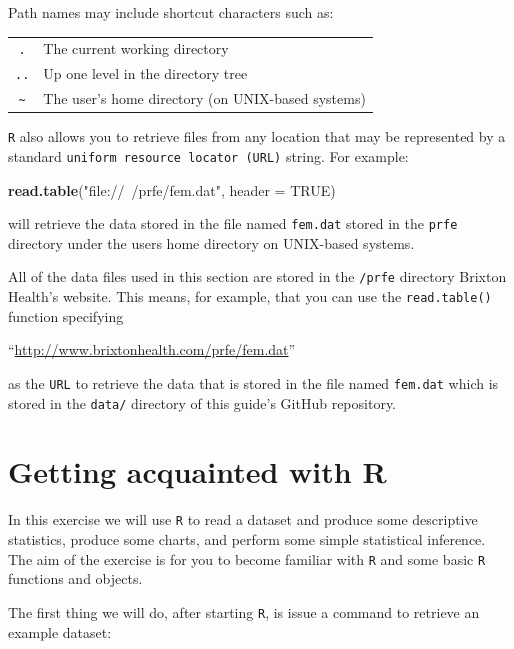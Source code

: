 \documentclass[12pt,a4paper]{book}
\newenvironment{Shaded}{\begin{snugshade}}{\end{snugshade}}
\newcommand{\KeywordTok}[1]{\textcolor[rgb]{0.13,0.29,0.53}{\textbf{#1}}}
\newcommand{\DataTypeTok}[1]{\textcolor[rgb]{0.13,0.29,0.53}{#1}}
\newcommand{\StringTok}[1]{\textcolor[rgb]{0.31,0.60,0.02}{#1}}
\newcommand{\OtherTok}[1]{\textcolor[rgb]{0.56,0.35,0.01}{#1}}
\newcommand{\NormalTok}[1]{#1}
\theoremstyle{definition}
\theoremstyle{definition}
\theoremstyle{definition}
\theoremstyle{remark}
\begin{document}
Path names may include shortcut characters such as:

\begin{longtable}[]{@{}cl@{}}
\toprule
\texttt{.} & The current working directory\tabularnewline
\texttt{..} & Up one level in the directory tree\tabularnewline
\texttt{\textasciitilde{}} & The user's home directory (on UNIX-based
systems)\tabularnewline
\bottomrule
\end{longtable}

\texttt{R} also allows you to retrieve files from any location that may
be represented by a standard \texttt{uniform\ resource\ locator\ (URL)}
string. For example:

\begin{Shaded}
\begin{Highlighting}[]
\KeywordTok{read.table}\NormalTok{(}\StringTok{"file://~/prfe/fem.dat"}\NormalTok{, }\DataTypeTok{header =} \OtherTok{TRUE}\NormalTok{)}
\end{Highlighting}
\end{Shaded}

will retrieve the data stored in the file named \texttt{fem.dat} stored
in the \texttt{prfe} directory under the users home directory on
UNIX-based systems.

All of the data files used in this section are stored in the
\texttt{/prfe} directory Brixton Health's website. This means, for
example, that you can use the \texttt{read.table()} function specifying

``\url{http://www.brixtonhealth.com/prfe/fem.dat}''

as the \texttt{URL} to retrieve the data that is stored in the file
named \texttt{fem.dat} which is stored in the \texttt{data/} directory
of this guide's GitHub repository.

\hypertarget{exercise1}{%
\chapter{Getting acquainted with R}\label{exercise1}}

In this exercise we will use \texttt{R} to read a dataset and produce
some descriptive statistics, produce some charts, and perform some
simple statistical inference. The aim of the exercise is for you to
become familiar with \texttt{R} and some basic \texttt{R} functions and
objects.

The first thing we will do, after starting \texttt{R}, is issue a
command to retrieve an example dataset:
\end{document}
